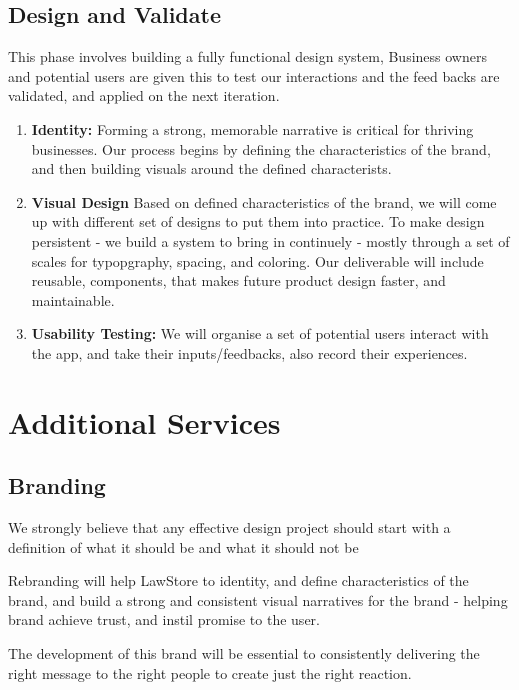 \documentclass[a4paper,10pt]{article}
\begin{document}
		\subsection{Design and Validate}
		
		This phase involves building a fully functional design system, Business
		owners and potential users are given this to test our interactions and
		the feed backs are validated, and applied on the next iteration.
		
		\begin{enumerate}
		\def\labelenumi{\arabic{enumi}.}
		\item
		\textbf{Identity:} Forming a strong, memorable narrative is critical
		for thriving businesses. Our process begins by defining the characteristics of the brand, and then building visuals around the defined characterists.
		\item
		\textbf{Visual Design} Based on defined characteristics of the brand, we will come up with different set of designs to put them into practice. To make design persistent - we build a system to bring in continuely - mostly through a set of scales for typopgraphy, spacing, and coloring. Our deliverable will include reusable, components, that makes future product design faster, and maintainable.
		\item
		\textbf{Usability Testing:} We will organise a set of potential users
		interact with the app, and take their inputs/feedbacks, also record
		their experiences.
		\end{enumerate}
		
	
		\section{ Additional Services}
		
		\subsection{ Branding}
		We strongly believe that any effective design project should start with a definition of what it should be and what it should not be
		
		Rebranding will help LawStore to identity, and define characteristics of the brand, and build a strong and consistent visual narratives for the brand - helping brand achieve trust, and instil promise to the user.
		
		The development of this brand will be essential to consistently delivering the right message to the right people to create just the right reaction.
		
\end{document}
